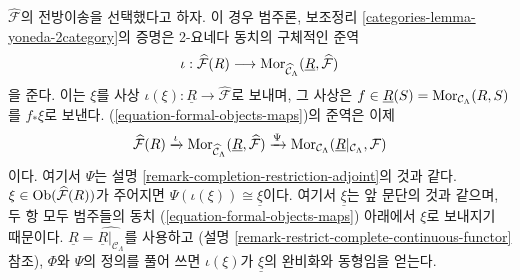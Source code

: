 \begin{remark}
\medskip\noindent
$\widehat{\mathcal{F}}$의 전방이송을 선택했다고 하자. 이 경우 범주론,
보조정리 \ref{categories-lemma-yoneda-2category}의 증명은
2-요네다 동치의 구체적인 준역
$$
\iota :
\widehat{\mathcal{F}}(R) \longrightarrow
\mathop{\mathrm{Mor}}\nolimits_{\widehat{\mathcal{C}}_\Lambda}(
\underline{R}, \widehat{\mathcal{F}})
$$
을 준다. 이는 $\xi$를 사상
$\iota(\xi) : \underline{R} \to \widehat{\mathcal{F}}$로 보내며,
그 사상은 $f \in \underline{R}(S) = \mathop{\mathrm{Mor}}\nolimits_{\mathcal{C}_\Lambda}(R, S)$를
$f_*\xi$로 보낸다.%
(\ref{equation-formal-objects-maps})의 준역은 이제
$$
\widehat{\mathcal{F}}(R)
\xrightarrow{\iota}
\mathop{\mathrm{Mor}}\nolimits_{\widehat{\mathcal{C}}_\Lambda}(
\underline{R}, \widehat{\mathcal{F}})
\xrightarrow{\Psi}
\mathop{\mathrm{Mor}}\nolimits_{\mathcal{C}_\Lambda}(
\underline{R}|_{\mathcal{C}_\Lambda}, \mathcal{F})
$$
이다. 여기서 $\Psi$는 설명
\ref{remark-completion-restriction-adjoint}의 것과 같다.
$\xi \in \mathop{\mathrm{Ob}}\nolimits(\widehat{\mathcal{F}}(R))$가 주어지면
$\Psi(\iota(\xi)) \cong \underline{\xi}$이다. 여기서
$\underline{\xi}$는 앞 문단의 것과 같으며, 두 항 모두 범주들의 동치
(\ref{equation-formal-objects-maps}) 아래에서 $\xi$로 보내지기 때문이다.
$\underline{R} = \widehat{\underline{R}|_{\mathcal{C}_\Lambda}}$를 사용하고
(설명 \ref{remark-restrict-complete-continuous-functor} 참조),
$\Phi$와 $\Psi$의 정의를 풀어 쓰면 $\iota(\xi)$가
$\underline{\xi}$의 완비화와 동형임을 얻는다.
\end{remark}


